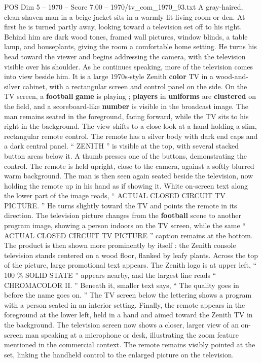 \begin{textsample}{POS Dim 5 – 1970 – Score 7.00 – 1970/tv\_com\_1970\_93.txt}  \label{ex:f5_pos_083}
A gray-haired, clean-shaven man in a beige jacket sits in a warmly lit living room or den.
At first he is turned partly away, looking toward a television set off to his right.
Behind him are dark wood tones, framed wall pictures, window blinds, a table lamp, and houseplants, giving the room a comfortable home setting.
He turns his head toward the viewer and begins addressing the camera, with the television visible over his shoulder.
As he continues speaking, more of the television comes into view beside him.
It is a large 1970s-style Zenith \textbf{color} TV in a wood-and-silver cabinet, with a rectangular screen and control panel on the side.
On the TV screen, a \textbf{football} \textbf{game} is playing ; \textbf{players} in \textbf{uniforms} are \textbf{clustered} on the field, and a scoreboard-like \textbf{number} is visible in the broadcast image.
The man remains seated in the foreground, facing forward, while the TV sits to his right in the background.
The view shifts to a close look at a hand holding a slim, rectangular remote control.
The remote has a silver body with dark end caps and a dark central panel. “ ZENITH ” is visible at the top, with several stacked button areas below it.
A thumb presses one of the buttons, demonstrating the control.
The remote is held upright, close to the camera, against a softly blurred warm background.
The man is then seen again seated beside the television, now holding the remote up in his hand as if showing it.
White on-screen text along the lower part of the image reads, “ ACTUAL CLOSED CIRCUIT TV PICTURE. ” He turns slightly toward the TV and points the remote in its direction.
The television picture changes from the \textbf{football} scene to another program image, showing a person indoors on the TV screen, while the same “ ACTUAL CLOSED CIRCUIT TV PICTURE ” caption remains at the bottom.
The product is then shown more prominently by itself : the Zenith console television stands centered on a wood floor, flanked by leafy plants.
Across the top of the picture, large promotional text appears.
The Zenith logo is at upper left, “ 100 \% SOLID STATE ” appears nearby, and the largest line reads “ CHROMACOLOR II. ” Beneath it, smaller text says, “ The quality goes in before the name goes on. ” The TV screen below the lettering shows a program with a person seated in an interior setting.
Finally, the remote appears in the foreground at the lower left, held in a hand and aimed toward the Zenith TV in the background.
The television screen now shows a closer, larger view of an on-screen man speaking at a microphone or desk, illustrating the zoom feature mentioned in the commercial context.
The remote remains visibly pointed at the set, linking the handheld control to the enlarged picture on the television.

\end{textsample}
